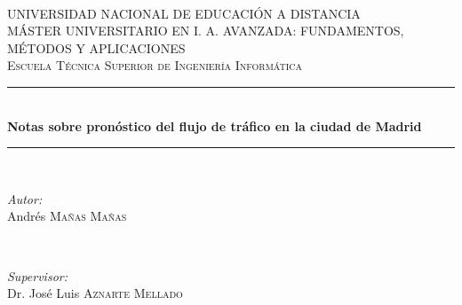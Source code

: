 
\frontmatter

\begin{titlepage}

\newcommand{\HRule}{\rule{\linewidth}{0.5mm}} %

\center %


\textsc{\large }\\[1cm] %

\textsc{\LARGE UNIVERSIDAD NACIONAL DE EDUCACIÓN A DISTANCIA}\\[1cm] %
\textsc{\Large MÁSTER UNIVERSITARIO EN I. A. AVANZADA: FUNDAMENTOS, MÉTODOS Y APLICACIONES}\\[1cm] %
\textsc{\large Escuela Técnica Superior de Ingeniería Informática}\\[2cm] %


\HRule \\[0.4cm]
{ \huge \bfseries Notas sobre pronóstico del flujo de tráfico en la ciudad de Madrid}\\[0.4cm] %
\HRule \\[1.5cm]


\begin{minipage}{0.4\textwidth}
\begin{flushleft} \large
\emph{Autor:}\\
Andrés \textsc{Mañas Mañas} %
\end{flushleft}
\end{minipage}
~
\begin{minipage}{0.4\textwidth}
\begin{flushright} \large
\emph{Supervisor:} \\
Dr. José Luis \textsc{Aznarte Mellado} %
\end{flushright}
\end{minipage}\\[2cm]


\end{titlepage}
